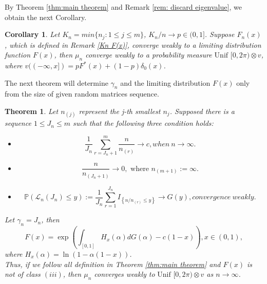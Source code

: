 \documentclass[12pt]{article}
\theoremstyle{plain}
\newtheorem{thm}{\textbf{Theorem}}
\newtheorem{cor}{\textbf{Corollary}}
\theoremstyle{definition}
\theoremstyle{remark}
\begin{document}
By Theorem \ref{thm:main theorem} and Remark \ref{rem: discard eigenvalue}, we obtain the next Corollary.
\begin{cor}
    Let $K_n=min\{ n_j : 1\leq j\leq m\}$,  $K_n/n\rightarrow p\in (0,1]$. Suppose $F_n(x)$, which is defined in Remark \ref{Kn F(x)}, converge weakly to a limiting distribution function $F(x)$, then $\mu_{n}$ converge weakly to a probability measure $\text {Unif }[0,2 \pi) \otimes v$, where $v((-\infty,x])=pF^*(x)+(1-p)\delta_0(x)$.
\end{cor}

The next theorem will determine $\gamma_n$ and the limiting distribution $F(x)$ only from the size of given random matrices sequence.

\begin{thm}\label{thm:main theorem 2 with L}
     Let $n_{(j)}$ represent the j-th smallest $n_j$. Supposed there is a sequence $1\leq J_n \leq m$ such that the following three condition holds:\\
    \begin{itemize}
        \item [1.]  \begin{equation*}
        \frac{1}{J_n}\sum_{r=J_n+1}^{m}\dfrac{n}{n_{(r)}}\rightarrow c, when\ n\rightarrow \infty.
        \end{equation*}
        \item [2.]\begin{equation*}
        \dfrac{n}{n_{(J_n+1)}}\rightarrow 0,\text{ where } n_{(m+1)}:=\infty.
        \end{equation*}

        \item [3.]  \begin{equation*}
        \mathbb{P}\left(\mathscr{L}_{n}(J_n) \leqslant y\right):=\frac{1}{J_{n}} \sum_{r=1}^{J_{n}} I_{\left\{n / n_{(r)} \leqslant y\right\}} \rightarrow G(y), convergence\ weakly.
        \end{equation*}
    \end{itemize}

    Let $\gamma_{n}=J_n$, then
    \begin{equation}
    F(x)=\exp(\int_{[0,1]} H_{x}(\alpha) d G(\alpha)-c(1-x)), x \in(0,1),
    \end{equation}
    where $H_{x}(\alpha)=\ln (1-\alpha(1-x))$.\\
    Thus, if we follow all definition in Theorem \ref{thm:main theorem} and $F(x)$ is not of class $(iii)$, then  $\mu_{n}$ converges weakly to$\text { Unif }[0,2 \pi) \otimes v$ as $n\to \infty$.
    \end{thm}
\end{document}

